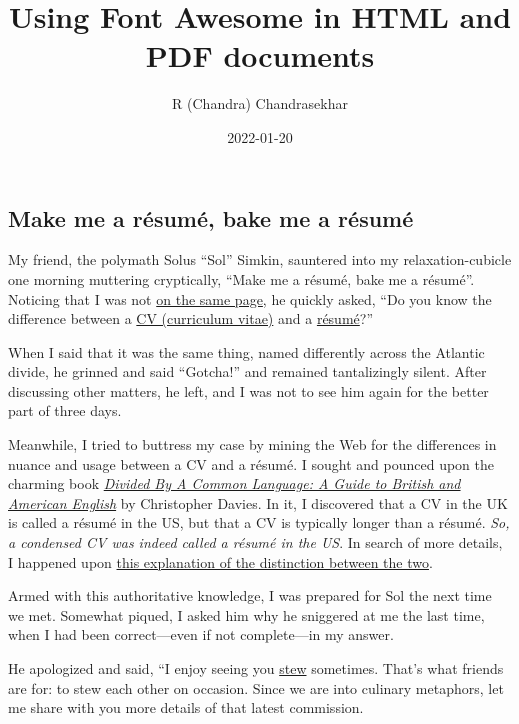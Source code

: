 \documentclass[
  british,
  a4paper,
  rgb,
  dvipsnames,
  svgnames,
  hyphens]{article}
\title{Using Font Awesome in HTML and PDF documents}
\author{R (Chandra) Chandrasekhar}
\date{2022-01-20}
\begin{document}
\maketitle

\setlength{\parindent}{0pt} %
\thispagestyle{empty}


\hypertarget{make-me-a-ruxe9sumuxe9-bake-me-a-ruxe9sumuxe9}{%
\subsection{Make me a résumé, bake me a
résumé}\label{make-me-a-ruxe9sumuxe9-bake-me-a-ruxe9sumuxe9}}

My friend, the polymath Solus ``Sol'' Simkin, sauntered into my
relaxation-cubicle one morning muttering cryptically, ``Make me a
résumé, bake me a résumé''. Noticing that I was not
\href{https://www.macmillandictionary.com/dictionary/british/be-on-the-same-page}{on
the same page}, he quickly asked, ``Do you know the difference between a
\href{https://www.thefreedictionary.com/curriculum+vitae}{CV (curriculum
vitae)} and a
\href{https://www.collinsdictionary.com/dictionary/english/résumé}{résumé}?''

When I said that it was the same thing, named differently across the
Atlantic divide, he grinned and said ``Gotcha!'' and remained
tantalizingly silent. After discussing other matters, he left, and I was
not to see him again for the better part of three days.

Meanwhile, I tried to buttress my case by mining the Web for the
differences in nuance and usage between a CV and a résumé. I sought and
pounced upon the charming book
\href{https://www.amazon.in/Divided-Common-Language-Christopher-Davies/dp/0618911626/}{\emph{Divided
By A Common Language: A Guide to British and American English}} by
Christopher Davies. In it, I discovered that a CV in the UK is called a
résumé in the US, but that a CV is typically longer than a résumé.
\emph{So, a condensed CV was indeed called a résumé in the US}. In
search of more details, I happened upon
\href{https://icc.ucdavis.edu/materials/résumé/résumécv}{this
explanation of the distinction between the two}.

Armed with this authoritative knowledge, I was prepared for Sol the next
time we met. Somewhat piqued, I asked him why he sniggered at me the
last time, when I had been correct---even if not complete---in my
answer.

He apologized and said, ``I enjoy seeing you
\href{https://www.thefreedictionary.com/stew}{stew} sometimes. That's
what friends are for: to stew each other on occasion. Since we are into
culinary metaphors, let me share with you more details of that latest
commission.
\end{document}
